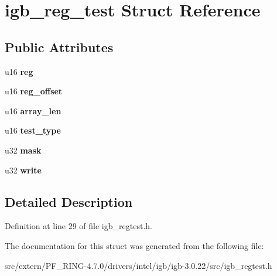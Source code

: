 \hypertarget{structigb__reg__test}{
\section{igb\_\-reg\_\-test Struct Reference}
\label{structigb__reg__test}
}
\subsection*{Public Attributes}
\begin{DoxyCompactItemize}
\item 
\hypertarget{structigb__reg__test_a2e67b50677cab9dd9ab1111ca5057d69}{
u16 {\bfseries reg}}
\label{structigb__reg__test_a2e67b50677cab9dd9ab1111ca5057d69}

\item 
\hypertarget{structigb__reg__test_a0e12d00b20dddc16c8a3fd821cd6aedf}{
u16 {\bfseries reg\_\-offset}}
\label{structigb__reg__test_a0e12d00b20dddc16c8a3fd821cd6aedf}

\item 
\hypertarget{structigb__reg__test_a496f60f72b35cccf22ffe986bd71c3a6}{
u16 {\bfseries array\_\-len}}
\label{structigb__reg__test_a496f60f72b35cccf22ffe986bd71c3a6}

\item 
\hypertarget{structigb__reg__test_a1ad1148b622b6366d28ec3f0e6d5927d}{
u16 {\bfseries test\_\-type}}
\label{structigb__reg__test_a1ad1148b622b6366d28ec3f0e6d5927d}

\item 
\hypertarget{structigb__reg__test_a821ccc20dabf194e1b215253fa7fed8e}{
u32 {\bfseries mask}}
\label{structigb__reg__test_a821ccc20dabf194e1b215253fa7fed8e}

\item 
\hypertarget{structigb__reg__test_a79f05e57d93ec29f7406a16356d4e9a3}{
u32 {\bfseries write}}
\label{structigb__reg__test_a79f05e57d93ec29f7406a16356d4e9a3}

\end{DoxyCompactItemize}


\subsection{Detailed Description}


Definition at line 29 of file igb\_\-regtest.h.



The documentation for this struct was generated from the following file:\begin{DoxyCompactItemize}
\item 
src/extern/PF\_\-RING-\/4.7.0/drivers/intel/igb/igb-\/3.0.22/src/igb\_\-regtest.h\end{DoxyCompactItemize}
